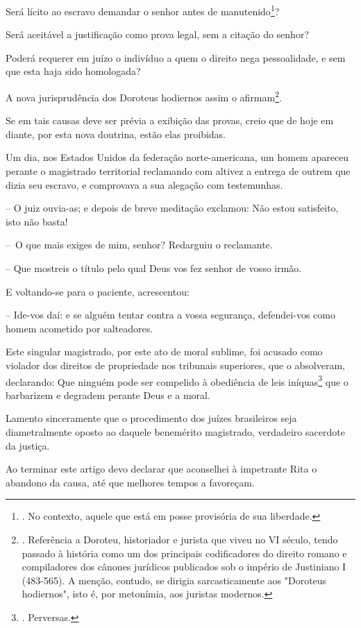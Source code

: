 Será lícito ao escravo demandar o senhor antes de manutenido\footnote{.
  No contexto, aquele que está em posse provisória de sua liberdade.}?

Será aceitável a justificação como prova legal, sem a citação do senhor?

Poderá requerer em juízo o indivíduo a quem o direito nega pessoalidade,
e sem que esta haja sido homologada?

A nova jurisprudência dos Doroteus hodiernos assim o afirmam\footnote{.
  Referência a Doroteu, historiador e jurista que viveu no VI século,
  tendo passado à história como um dos principais codificadores do
  direito romano e compiladores dos cânones jurídicos publicados sob o
  império de Justiniano I (483-565). A menção, contudo, se dirigia
  sarcasticamente aos "Doroteus hodiernos", isto é, por metonímia, aos
  juristas modernos.}.

Se em tais causas deve ser prévia a exibição das provas, creio que de
hoje em diante, por esta nova doutrina, estão elas proibidas.

Um dia, nos Estados Unidos da federação norte-americana, um homem
apareceu perante o magistrado territorial reclamando com altivez a
entrega de outrem que dizia seu escravo, e comprovava a sua alegação com
testemunhas.

-- O juiz ouvia-as; e depois de breve meditação exclamou: Não estou
satisfeito, isto não basta!

--~O que mais exiges de mim, senhor? Redarguiu o reclamante.

-- Que mostreis o título pelo qual Deus vos fez senhor de vosso irmão.

E voltando-se para o paciente, acrescentou:

-- Ide-vos daí: e se alguém tentar contra a vossa segurança,
defendei-vos como homem acometido por salteadores.

Este singular magistrado, por este ato de moral sublime, foi acusado
como violador dos direitos de propriedade nos tribunais superiores, que
o absolveram, declarando: Que ninguém pode ser compelido à obediência de
leis iníquas\footnote{. Perversas.} que o barbarizem e degradem perante
Deus e a moral.

Lamento sinceramente que o procedimento dos juízes brasileiros seja
diametralmente oposto ao daquele benemérito magistrado, verdadeiro
sacerdote da justiça.

Ao terminar este artigo devo declarar que aconselhei à impetrante Rita o
abandono da causa, até que melhores tempos a favoreçam.

